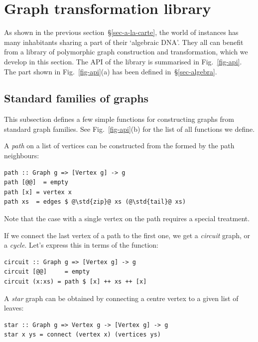 \section{Graph transformation library}\label{sec-transformations}

As shown in the previous section~\S\ref{sec-a-la-carte}, the world of 
instances has many inhabitants sharing a part of their `algebraic DNA'. They all
can benefit from a library of polymorphic graph construction and transformation,
which we develop in this section. The API of the library is summarised in
Fig.~\ref{fig-api}. The part shown in Fig.~\ref{fig-api}(a) has been defined
in~\S\ref{sec-algebra}.

\subsection{Standard families of graphs}\label{sub-families}

This subsection defines a few simple functions for constructing graphs from
standard graph families. See Fig.~\ref{fig-api}(b) for the list of all functions
we define.

A \emph{path} on a list of vertices can be constructed from the 
formed by the path neighbours:

\begin{verbatim}
path :: Graph g => [Vertex g] -> g
path [@@]  = empty
path [x] = vertex x
path xs  = edges $ @\std{zip}@ xs (@\std{tail}@ xs)
\end{verbatim}

\noindent
Note that the case with a single vertex on the path requires a special treatment.

If we connect the last vertex of a path to the first one, we get a \emph{circuit}
graph, or a \emph{cycle}. Let's express this in terms of the  function:

\begin{verbatim}
circuit :: Graph g => [Vertex g] -> g
circuit [@@]     = empty
circuit (x:xs) = path $ [x] ++ xs ++ [x]
\end{verbatim}

A \emph{star} graph can be obtained by connecting a centre vertex to a given
list of leaves:

\begin{verbatim}
star :: Graph g => Vertex g -> [Vertex g] -> g
star x ys = connect (vertex x) (vertices ys)
\end{verbatim}

